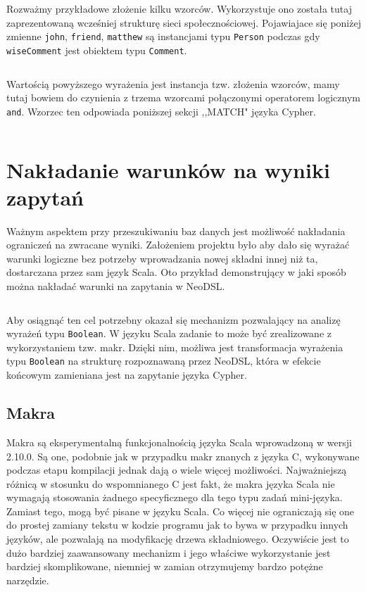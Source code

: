 \documentclass[brudnopis]{xmgr}
\begin{document}
Rozważmy przykładowe złożenie kilku wzorców. Wykorzystuje ono została tutaj zaprezentowaną wcześniej strukturę sieci społecznościowej. Pojawiajace się poniżej zmienne \texttt{john}, \texttt{friend}, \texttt{matthew} są instancjami typu \texttt{Person} podczas gdy \texttt{wiseComment} jest obiektem typu \texttt{Comment}.

\inputminted{scala}{listings/scala/dsl/patterns/functional-example-1.scala}

Wartością powyższego wyrażenia jest instancja tzw. złożenia wzorców, mamy tutaj bowiem do czynienia z trzema wzorcami połączonymi operatorem logicznym \texttt{and}. Wzorzec ten odpowiada poniższej sekcji ,,MATCH" języka Cypher.

\inputminted{cypher}{listings/cypher/patterns-dsl-example.cypher}

\section{Nakładanie warunków na wyniki zapytań}

Ważnym aspektem przy przeszukiwaniu baz danych jest możliwość nakładania ograniczeń na zwracane wyniki. Założeniem projektu było aby dało się wyrażać warunki logiczne bez potrzeby wprowadzania nowej składni innej niż ta, dostarczana przez sam język Scala. Oto przykład demonstrujący w jaki sposób można nakładać warunki na zapytania w NeoDSL.

\inputminted{scala}{listings/scala/dsl/query-with-simple-condition.scala}

Aby osiągnąć ten cel potrzebny okazał się mechanizm pozwalający na analizę wyrażeń typu \texttt{Boolean}. W języku Scala zadanie to może być zrealizowane z wykorzystaniem tzw. makr. 
Dzięki nim, możliwa jest transformacja wyrażenia typu \texttt{Boolean} na strukturę rozpoznawaną przez NeoDSL, która w efekcie końcowym zamieniana jest na zapytanie języka Cypher.

\subsection{Makra}

Makra są eksperymentalną funkcjonalnością języka Scala wprowadzoną w wersji 2.10.0. Są one, podobnie jak w przypadku makr znanych z języka C, wykonywane podczas etapu kompilacji jednak dają o wiele więcej możliwości. Najważniejszą różnicą w stosunku do wspomnianego C jest fakt, że makra języka Scala nie wymagają stosowania żadnego specyficznego dla tego typu zadań mini-języka. Zamiast tego, mogą być pisane w języku Scala. Co więcej nie ograniczają się one do prostej zamiany tekstu w kodzie programu jak to bywa w przypadku innych języków, ale pozwalają na modyfikację drzewa składniowego. Oczywiście jest to dużo bardziej zaawansowany mechanizm i jego właściwe wykorzystanie jest bardziej skomplikowane, niemniej w zamian otrzymujemy bardzo potężne narzędzie.
\end{document}
